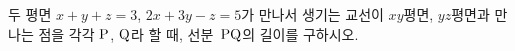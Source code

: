 두 평면 $x+y+z=3$, $2x+3y-z=5$가 만나서 생기는 교선이 $xy$평면, $yz$평면과 만나는 점을 각각 $\mathrm{P}$, $\mathrm{Q}$라 할 때, 선분~$\mathrm{PQ}$의 길이를 구하시오.
